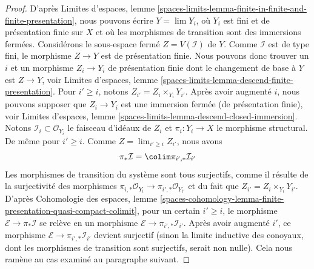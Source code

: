 \begin{proof}
\medskip\noindent
D'après Limites d'espaces, lemme
\ref{spaces-limits-lemma-finite-in-finite-and-finite-presentation},
nous pouvons écrire $Y = \lim Y_i$, où $Y_i$ est fini et de
présentation finie sur $X$ et où les morphismes de transition sont des
immersions fermées. Considérons le sous-espace fermé $Z = V(\mathcal{I})$ de $Y$.
Comme $\mathcal{I}$ est de type fini, le morphisme $Z \to Y$ est de
présentation finie. Nous pouvons donc trouver un $i$ et un morphisme
$Z_i \to Y_i$ de présentation finie dont le changement de base à $Y$
est $Z \to Y$, voir Limites d'espaces, lemme
\ref{spaces-limits-lemma-descend-finite-presentation}.
Pour $i' \geq i$, notons $Z_{i'} = Z_i \times_{Y_i} Y_{i'}$.
Après avoir augmenté $i$, nous pouvons supposer que $Z_i \to Y_i$ est une
immersion fermée (de présentation finie), voir Limites d'espaces, lemme
\ref{spaces-limits-lemma-descend-closed-immersion}. Notons
$\mathcal{I}_i \subset \mathcal{O}_{Y_i}$ le faisceau d'idéaux
de $Z_i$ et $\pi_i : Y_i \to X$ le morphisme structural.
De même pour $i' \geq i$. Comme $Z = \lim_{i' \geq i} Z_{i'}$, nous avons
$$
\pi_*\mathcal{I} = \colim \pi_{i', *}\mathcal{I}_{i'}
$$
Les morphismes de transition du système sont tous surjectifs,
comme il résulte de la surjectivité des morphismes
$\pi_{i, *}\mathcal{O}_{Y_i} \to \pi_{i', *}\mathcal{O}_{Y_{i'}}$
et du fait que $Z_{i'} = Z_i \times_{Y_i} Y_{i'}$.
D'après Cohomologie des espaces, lemme
\ref{spaces-cohomology-lemma-finite-presentation-quasi-compact-colimit},
pour un certain $i' \geq i$, le morphisme $\mathcal{E} \to \pi_*\mathcal{I}$
se relève en un morphisme $\mathcal{E} \to \pi_{i', *}\mathcal{I}_{i'}$.
Après avoir augmenté $i'$, ce morphisme
$\mathcal{E} \to \pi_{i', *}\mathcal{I}_{i'}$
devient surjectif (sinon la limite inductive des conoyaux,
dont les morphismes de transition sont surjectifs, serait non nulle).
Cela nous ramène au cas examiné au paragraphe suivant.


\end{proof}
